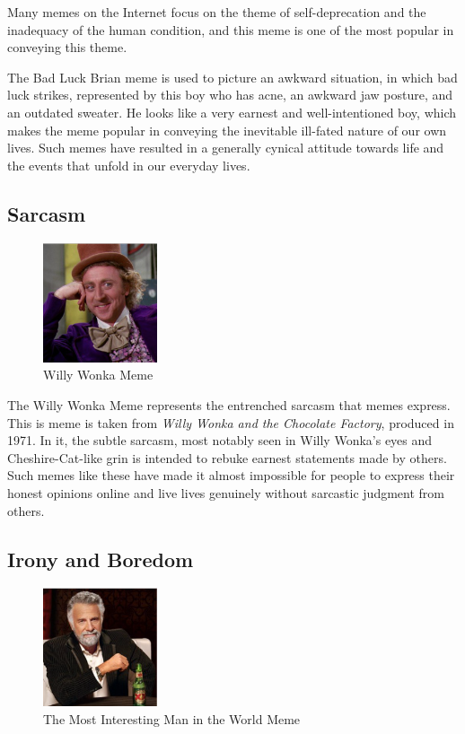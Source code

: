 \documentclass[12pt,letterpaper]{article}
\begin{document}
Many memes on the Internet focus on the theme of self-deprecation and the inadequacy of the human condition, and this meme is one of the most popular in conveying this theme.

The Bad Luck Brian meme is used to picture an awkward situation, in which bad luck strikes, represented by this boy who has acne, an awkward jaw posture, and an outdated sweater.  He looks like a very earnest and well-intentioned boy, which makes the meme popular in conveying the inevitable ill-fated nature of our own lives.  Such memes have resulted in a generally cynical attitude towards life and the events that unfold in our  everyday lives.

\subsection{Sarcasm}

\begin{figure}[!h]
	\centering
	\includegraphics[width=0.3\textwidth]{graphics/10}
	\caption{Willy Wonka Meme}
	\label{3}
\end{figure}

The Willy Wonka Meme represents the entrenched sarcasm that memes express.  This is meme is taken from \textit{Willy Wonka and the Chocolate Factory}, produced in 1971. In it, the subtle sarcasm, most notably seen in Willy Wonka's eyes and Cheshire-Cat-like grin is intended to rebuke earnest statements made by others.  Such memes like these have made it almost impossible for people to express their honest opinions online and live lives genuinely without sarcastic judgment from others.

\subsection{Irony and Boredom}

\begin{figure}[!h]
	\centering
	\includegraphics[width=0.3\textwidth]{graphics/9}
	\caption{The Most Interesting Man in the World Meme}
	\label{4}
\end{figure}
\end{document}
